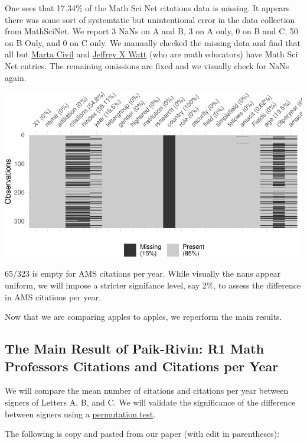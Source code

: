 \documentclass[]{article}
\begin{document}
One sees that 17.34\% of the Math Sci Net citations data is missing. It
appears there was some sort of systemtatic but unintentional error in
the data collection from MathSciNet. We report 3 NaNs on A and B, 3 on A
only, 0 on B and C, 50 on B Only, and 0 on C only. We manually checked
the missing data and find that all but
\href{https://www.math.arizona.edu/~civil/}{Marta Civil} and
\href{https://science.iupui.edu/people/watt-jeffrey}{Jeffrey X Watt}
(who are math educators) have Math Sci Net entries. The remaining
omissions are fixed and we visually check for NaNs again.

\includegraphics{Response_files/figure-latex/unnamed-chunk-6-1.pdf}

65/323 is empty for AMS citations per year. While visually the nans
appear uniform, we will impose a stricter signifance level, say 2\%, to
assess the difference in AMS citations per year.

Now that we are comparing apples to apples, we reperform the main
results.

\hypertarget{the-main-result-of-paik-rivin-r1-math-professors-citations-and-citations-per-year}{%
\subsection{The Main Result of Paik-Rivin: R1 Math Professors Citations
and Citations per
Year}\label{the-main-result-of-paik-rivin-r1-math-professors-citations-and-citations-per-year}}

We will compare the mean number of citations and citations per year
between signers of Letters A, B, and C. We will validate the
significance of the difference between signers using a
\href{https://en.wikipedia.org/wiki/Resampling_(statistics)\#Permutation_tests}{permutation
test}.

The following is copy and pasted from our paper (with edit in
parentheses):
\end{document}

